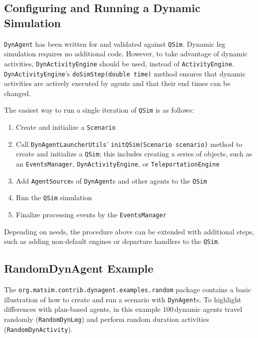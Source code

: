 \subsection{Configuring and Running a Dynamic Simulation}
\label{sec:config-dyn-sim}
\lstinline$DynAgent$ has been written for and validated against \lstinline$QSim$. Dynamic leg simulation requires no additional code. However, to take advantage of dynamic activities,  \lstinline$DynActivityEngine$ should be used, instead of \lstinline$ActivityEngine$. \lstinline$DynActivityEngine$'s \lstinline$doSimStep(double time)$ method ensures that dynamic activities are actively executed by agents and that their end times can be changed.

The easiest way to run a single iteration of \lstinline$QSim$ is as follows:
%
\begin{enumerate}
	\item Create and initialize a \lstinline$Scenario$

	\item Call \lstinline$DynAgentLauncherUtils$' \lstinline$initQSim(Scenario scenario)$ method to create and initialize a \lstinline$QSim$; this includes creating a series of objects, such as an \lstinline$EventsManager$, \lstinline$DynActivityEngine$, or \lstinline$TeleportationEngine$

	\item Add \lstinline$AgentSource$s of \lstinline$DynAgent$s and other agents to the \lstinline$QSim$
	
	\item Run the \lstinline$QSim$ simulation
	
	\item Finalize processing events by the \lstinline$EventsManager$
	
\end{enumerate}
%
Depending on needs, the procedure above can be extended with additional steps, such as adding non-default engines or departure handlers to the \lstinline$QSim$.

\subsection{RandomDynAgent Example}
The \lstinline$org.matsim.contrib.dynagent.examples.random$ package contains a basic illustration of how to create and run a scenario with \lstinline$DynAgent$s. To highlight differences with plan-based agents, in this example 100\,dynamic agents travel randomly (\lstinline$RandomDynLeg$) and perform random duration activities (\lstinline$RandomDynActivity$).

